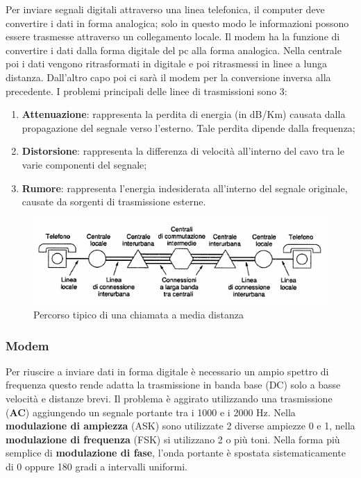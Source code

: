 Per inviare segnali digitali attraverso una linea telefonica, il computer deve convertire i dati in forma analogica; solo in questo modo le informazioni possono essere trasmesse attraverso un collegamento locale.
Il modem ha la funzione di convertire i dati dalla forma digitale del pc alla forma analogica. Nella centrale poi i dati vengono ritrasformati in digitale e poi ritrasmessi in linee a lunga distanza. Dall'altro capo poi ci sarà il modem per la conversione inversa alla precedente. 
I problemi principali delle linee di trasmissioni sono 3:

\begin{enumerate}

\item{\textbf{Attenuazione}: rappresenta la perdita di energia (in dB/Km) causata dalla propagazione del segnale verso l'esterno. Tale perdita dipende dalla frequenza};
\item{\textbf{Distorsione}: rappresenta la differenza di velocità all'interno del cavo tra le varie componenti del segnale};
\item{\textbf{Rumore}: rappresenta l'energia indesiderata all'interno del segnale originale, causate da sorgenti di trasmissione esterne}.

\end{enumerate}

\begin{figure}[htbp]
\centering
\includegraphics[scale=1]{images/phone.png}
\caption{Percorso tipico di una chiamata a media distanza}
\end{figure}

\subsubsection*{Modem}

Per riuscire a inviare dati in forma digitale è necessario un ampio spettro di frequenza questo rende adatta la trasmissione in banda base (DC) solo a basse velocità e distanze brevi. Il problema è aggirato utilizzando una trasmissione (\textbf{AC}) aggiungendo un segnale portante tra i 1000 e i 2000 Hz. Nella \textbf{modulazione di ampiezza} (ASK) sono utilizzate 2 diverse ampiezze 0 e 1, nella \textbf{modulazione di frequenza} (FSK) si utilizzano 2 o più toni. Nella forma più semplice di \textbf{modulazione di fase}, l'onda portante è spostata sistematicamente di 0 oppure 180 gradi a intervalli uniformi.

